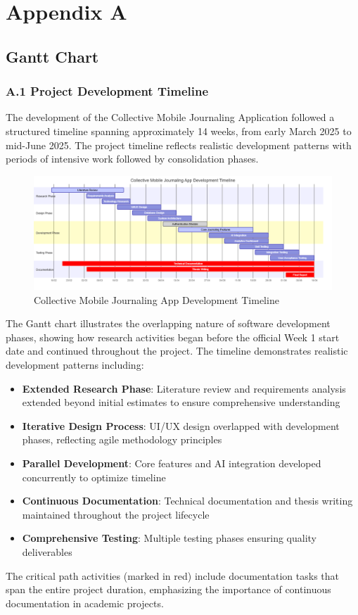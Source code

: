 \chapter*{Appendix A}

\section*{Gantt Chart}

\subsection*{A.1 Project Development Timeline}

The development of the Collective Mobile Journaling Application followed a structured timeline spanning approximately 14 weeks, from early March 2025 to mid-June 2025. The project timeline reflects realistic development patterns with periods of intensive work followed by consolidation phases.

\begin{figure}[H]
\centering
\includegraphics[width=\textwidth]{files/imgs/gantt_chart.png}
\caption{Collective Mobile Journaling App Development Timeline}
\label{fig:gantt-chart}
\end{figure}

The Gantt chart illustrates the overlapping nature of software development phases, showing how research activities began before the official Week 1 start date and continued throughout the project. The timeline demonstrates realistic development patterns including:

\begin{itemize}
    \item \textbf{Extended Research Phase}: Literature review and requirements analysis extended beyond initial estimates to ensure comprehensive understanding
    \item \textbf{Iterative Design Process}: UI/UX design overlapped with development phases, reflecting agile methodology principles
    \item \textbf{Parallel Development}: Core features and AI integration developed concurrently to optimize timeline
    \item \textbf{Continuous Documentation}: Technical documentation and thesis writing maintained throughout the project lifecycle
    \item \textbf{Comprehensive Testing}: Multiple testing phases ensuring quality deliverables
\end{itemize}

The critical path activities (marked in red) include documentation tasks that span the entire project duration, emphasizing the importance of continuous documentation in academic projects.
